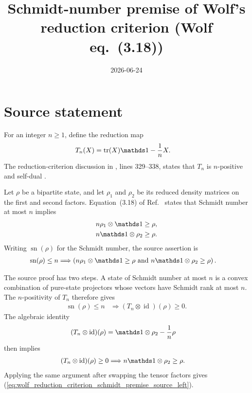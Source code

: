 \documentclass{article}
\title{Schmidt-number premise of Wolf's reduction criterion (Wolf eq.~(3.18))}
\author{}
\date{2026-06-24}
\begin{document}
\maketitle
{}

\section{Source statement}

For an integer $n\geq1$, define the reduction map
\begin{align}
    T_n(X)&=\tr(X)\Id-\frac{1}{n}X.
    \label{eq:wolf_reduction_criterion_schmidt_premise_reduction_map}
\end{align}
The reduction-criterion discussion in
, lines
329--338, states that $T_n$ is $n$-positive and self-dual
\cite{Wolf2012Quantum}.

Let $\rho$ be a bipartite state, and let $\rho_1$ and $\rho_2$ be its reduced
density matrices on the first and second factors. Equation~(3.18) of
Ref.~\cite{Wolf2012Quantum} states that Schmidt number at most $n$ implies
\begin{align}
    n\rho_1\otimes\Id&\geq\rho,
    \label{eq:wolf_reduction_criterion_schmidt_premise_source_left}\\
    n\Id\otimes\rho_2&\geq\rho.
    \label{eq:wolf_reduction_criterion_schmidt_premise_source_right}
\end{align}
Writing $\operatorname{sn}(\rho)$ for the Schmidt number, the source assertion
is
\begin{align}
    \operatorname{sn}(\rho)\leq n
        &\Longrightarrow
        \left(n\rho_1\otimes\Id\geq\rho
            \ \text{and}\
            n\Id\otimes\rho_2\geq\rho\right).
    \label{eq:wolf_reduction_criterion_schmidt_premise_source_implication}
\end{align}

The source proof has two steps. A state of Schmidt number at most $n$ is a
convex combination of pure-state projectors whose vectors have Schmidt rank at
most $n$. The $n$-positivity of $T_n$ therefore gives
\begin{align}
    \operatorname{sn}(\rho)\leq n
        &\Longrightarrow
        (T_n\otimes\operatorname{id})(\rho)\geq0.
    \label{eq:wolf_reduction_criterion_schmidt_premise_schmidt_to_positivity}
\end{align}
The algebraic identity
\begin{align}
    (T_n\otimes\operatorname{id})(\rho)
        &=\Id\otimes\rho_2-\frac{1}{n}\rho
    \label{eq:wolf_reduction_criterion_schmidt_premise_tensor_identity}
\end{align}
then implies
\begin{align}
    (T_n\otimes\operatorname{id})(\rho)\geq0
        &\Longrightarrow
        n\Id\otimes\rho_2\geq\rho.
    \label{eq:wolf_reduction_criterion_schmidt_premise_operator_step}
\end{align}
Applying the same argument after swapping the tensor factors gives
(\ref{eq:wolf_reduction_criterion_schmidt_premise_source_left}).
\end{document}

